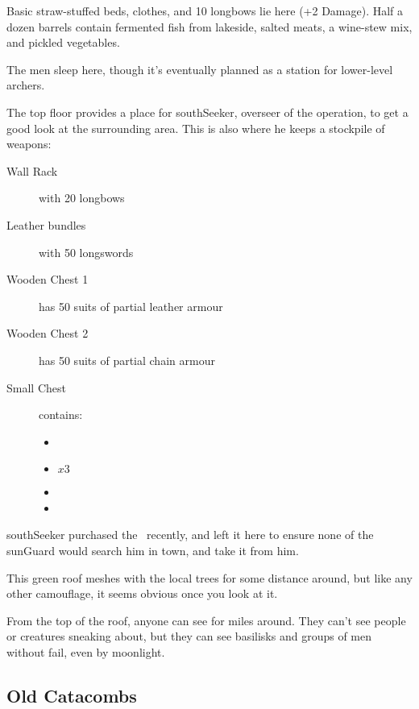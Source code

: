\begin{multicols}{2}

Basic straw-stuffed beds, clothes, and 10 longbows lie here (+2 Damage).
Half a dozen barrels contain fermented fish from \gls{lakeside}, salted meats, a wine-stew mix, and pickled vegetables.


The men sleep here, though it's eventually planned as a station for lower-level archers.


The top floor provides a place for \gls{southSeeker}, overseer of the operation, to get a good look at the surrounding area.
This is also where he keeps a stockpile of weapons:

\begin{description}
  \item[Wall Rack]
  with
  20 longbows
  \item[Leather bundles]
  with
  50 longswords
  \item[Wooden Chest 1]
  has
  50 suits of partial leather armour
  \item[Wooden Chest 2]
  has
  50 suits of partial chain armour
  \item[Small Chest]
  contains:
  \begin{itemize}
    \item
    \lootMagic
    \item
    \lootMagic $x 3$
    \item
    \lootMagic
    \item
    \lootTalisman
  \end{itemize}
\end{description}

\addtocounter{treasure}{-1}
\Gls{southSeeker} purchased the \lootTalisman\ recently, and left it here to ensure none of the \gls{sunGuard} would search him in \gls{town}, and take it from him.

\showTalisman


This green roof meshes with the local trees for some distance around, but like any other camouflage, it seems obvious once you look at it.

From the top of the roof, anyone can see for miles around.
They can't see people or creatures sneaking about, but they can see \glspl{basilisk} and groups of men without fail, even by moonlight.

\subsection{Old Catacombs}


\end{multicols}
